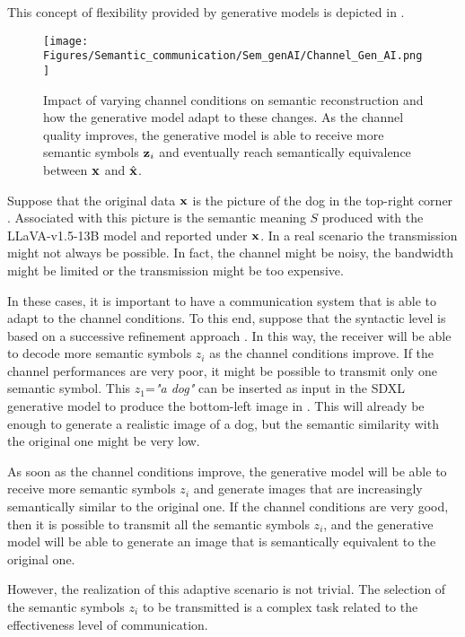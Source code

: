 This concept of flexibility provided by generative models is depicted in .

\begin{figure}
    \centering
    \texttt{[image: Figures/Semantic\_communication/Sem\_genAI/Channel\_Gen\_AI.png]}
    \caption[Semantic reconstruction performances as channel quality varies]{Impact of varying channel conditions on semantic reconstruction and how the generative model adapt to these changes. As the channel quality improves, the generative model is able to receive more semantic symbols $\mathbf{z}_i$ and eventually reach semantically equivalence between $\mathbf{x}$ and $\hat{\mathbf{x}}$.}
    \label{fig: SEMCOM generative_model_channel}
\end{figure}

Suppose that the original data $\mathbf{x}$ is the picture of the dog in the top-right corner \cite{Lexthehead2024Alex}. Associated with this picture is the semantic meaning $S$ produced with the  LLaVA-v1.5-13B model \cite{Liu_2024_CVPR} and reported under $\mathbf{x}$. In a real scenario the transmission might not always be possible. In fact, the channel might be noisy, the bandwidth might be limited or the transmission might be too expensive.

In these cases, it is important to have a communication system that is able to adapt to the channel conditions. To this end, suppose that the syntactic level is based on a successive refinement approach \cite{Tian2008SuccRefinement}. In this way, the receiver will be able to decode more semantic symbols $z_i$ as the channel conditions improve. If the channel performances are very poor, it might be possible to transmit only one semantic symbol. This $z_1$=\textit{"a dog"} can be inserted as input in the SDXL generative model \cite{Podell2023SDXL} to produce the bottom-left image in . This will already be enough to generate a realistic image of a dog, but the semantic similarity with the original one might be very low.

As soon as the channel conditions improve, the generative model will be able to receive more semantic symbols $z_i$ and generate images that are increasingly semantically similar to the original one. If the channel conditions are very good, then it is possible to transmit all the semantic symbols $z_i$, and the generative model will be able to generate an image that is semantically equivalent to the original one.

However, the realization of this adaptive scenario is not trivial. The selection of the semantic symbols $z_i$ to be transmitted is a complex task related to the effectiveness level of communication.

